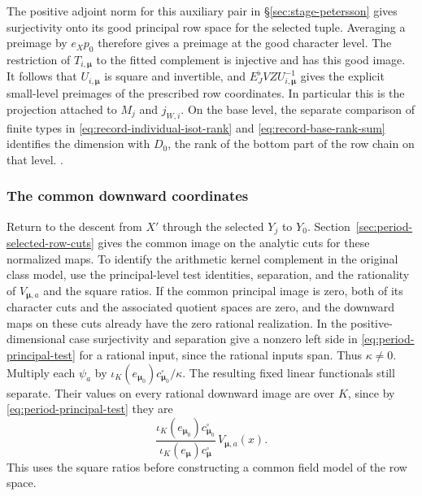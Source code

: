 The positive adjoint norm for this auxiliary pair in
\S\ref{sec:stage-petersson} gives surjectivity onto its
good principal row space for the selected tuple.
Averaging a preimage by \(e_Xp_0\) therefore gives a
preimage at the good character level.
The restriction of \(T_{i,\boldsymbol\mu}\) to the fitted
complement is injective and has this good image. It follows
that \(U_{i,\boldsymbol\mu}\) is square and invertible, and
\(E_J^\flat VZ U_{i,\boldsymbol\mu}^{-1}\) gives the explicit
small-level preimages of the prescribed row coordinates.
In particular this is the projection attached to \(M_j\)
and \(j_{W,i}\). On the base level, the separate comparison of
finite types in \eqref{eq:record-individual-isot-rank} and
\eqref{eq:record-base-rank-sum} identifies the dimension with
\(D_0\), the rank of the bottom part of the row chain on that
level.
.


%
\subsubsection{The common downward coordinates}
Return to the descent from \(X'\) through the selected \(Y_j\)
to \(Y_0\). Section~\ref{sec:period-selected-row-cuts} gives
the common image on the analytic cuts for these normalized
maps. To identify the arithmetic kernel complement in
the original class model, use the principal-level test
identities, separation, and the rationality of
\(V_{\boldsymbol\mu,a}\) and the square ratios. If the common
principal image is zero, both of its character cuts and the
associated quotient spaces are zero, and the downward maps on
these cuts already have the zero rational realization.
In the positive-dimensional case surjectivity and separation
give a nonzero left side in \eqref{eq:period-principal-test} for a
rational input, since the rational inputs span. Thus \(\kappa\ne0\).
Multiply each \(\psi_a\) by
\(\iota_K(e_{\boldsymbol\mu_0})c^\square_{\boldsymbol\mu_0}/\kappa\).
The resulting fixed linear functionals still separate. Their values
on every rational downward image are over \(K\), since by
\eqref{eq:period-principal-test} they are
\[
\frac{\iota_K(e_{\boldsymbol\mu_0})c^\square_{\boldsymbol\mu_0}}
     {\iota_K(e_{\boldsymbol\mu})c^\square_{\boldsymbol\mu}}\,
       V_{\boldsymbol\mu,a}(x).
\]
This uses the square ratios before constructing a common field
model of the row space.

